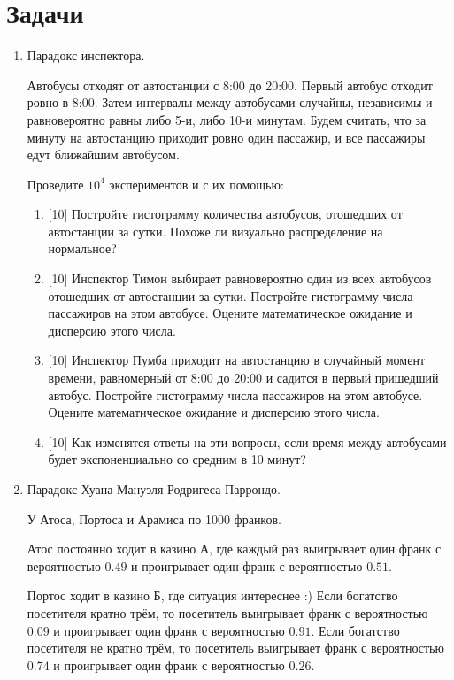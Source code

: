 \documentclass[12pt]{article}
\begin{document}
\section*{Задачи}
\begin{enumerate}
\item Парадокс инспектора. 

Автобусы отходят от автостанции с 8:00 до 20:00. Первый автобус отходит ровно в 8:00. 
Затем интервалы между автобусами случайны, независимы и равновероятно равны либо 5-и, либо 10-и
минутам. 
Будем считать, что за минуту на автостанцию приходит ровно один пассажир, 
и все пассажиры едут ближайшим автобусом.

Проведите $10^4$ экспериментов и с их помощью:

\begin{enumerate}
    \item {[10]} Постройте гистограмму количества автобусов, отошедших от автостанции за сутки. 
    Похоже ли визуально распределение на нормальное?
    \item {[10]} Инспектор Тимон выбирает равновероятно один из всех автобусов отошедших от автостанции за сутки. 
    Постройте гистограмму числа пассажиров на этом автобусе. Оцените математическое ожидание и дисперсию этого числа.
    \item {[10]} Инспектор Пумба приходит на автостанцию в случайный момент времени, равномерный от 8:00 до 20:00 и 
    садится в первый пришедший автобус. Постройте гистограмму числа пассажиров на этом автобусе. Оцените математическое ожидание и дисперсию этого числа.
    \item {[10]} Как изменятся ответы на эти вопросы, если время между автобусами будет экспоненциально со средним в 10 минут?
\end{enumerate}

\newpage
\item Парадокс Хуана Мануэля Родригеса Паррондо.

У Атоса, Портоса и Арамиса по 1000 франков. 

Атос постоянно ходит в казино А, где каждый раз выигрывает один франк с вероятностью $0.49$ и проигрывает 
один франк с вероятностью $0.51$.

Портос ходит в казино Б, где ситуация интереснее :) 
Если богатство посетителя кратно трём, то посетитель выигрывает франк с вероятностью $0.09$ 
и проигрывает один франк с вероятностью $0.91$. 
Если богатство посетителя не кратно трём, то посетитель выигрывает франк с вероятностью $0.74$ 
и проигрывает один франк с вероятностью $0.26$. 


\end{enumerate}
\end{document}
